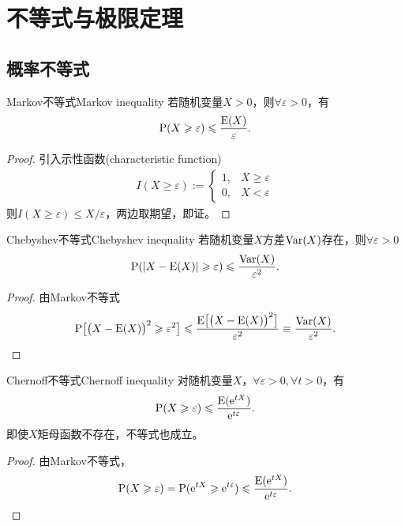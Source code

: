 \chapter{不等式与极限定理}
\section{概率不等式}
\begin{theorem}{Markov不等式}{Markov inequality}
	若随机变量$X>0$，则$\forall\varepsilon>0$，有
	\begin{align}
		\operatorname{P}(X\geqslant\varepsilon)\leqslant\frac{\operatorname{E}(X)}\varepsilon.
	\end{align}
\end{theorem}
\begin{proof}
	引入示性函数(characteristic function)
	\begin{align*}
		I(X\geqslant\varepsilon):=\begin{cases}
			1,&X\geqslant\varepsilon\\
			0,&X<\varepsilon
		\end{cases}
	\end{align*}
	则$I(X\geqslant\varepsilon)\leqslant X/\varepsilon$，两边取期望，即证。
\end{proof}
\begin{theorem}{Chebyshev不等式}{Chebyshev inequality}
	若随机变量$X$方差$\operatorname{Var}(X)$存在，则$\forall\varepsilon>0$
	\begin{align}
		\operatorname{P}(|X-\operatorname{E}(X)|\geqslant\varepsilon)\leqslant\frac{\operatorname{Var}(X)}{\varepsilon^2}.
	\end{align}
\end{theorem}
\begin{proof}
	由Markov不等式
	\begin{align*}
		\operatorname{P}\bigl[\bigl(X-\operatorname{E}(X)\bigr)^2\geqslant\varepsilon^2\bigr]\leqslant\frac{\operatorname{E}\bigl[\bigl(X-\operatorname{E}(X)\bigr)^2\bigr]}{\varepsilon^2}\equiv\frac{\operatorname{Var}(X)}{\varepsilon^2}.
	\end{align*}
\end{proof}
\begin{theorem}{Chernoff不等式}{Chernoff inequality}
	对随机变量$X$，$\forall\varepsilon>0,\forall t>0$，有
	\begin{align}
		\operatorname{P}(X\geqslant\varepsilon)\leqslant\frac{\operatorname{E}(\mathop{}\!\mathrm{e}^{tX})}{\mathop{}\!\mathrm{e}^{t\varepsilon}}.
	\end{align}
	即使$X$矩母函数不存在，不等式也成立。
\end{theorem}
\begin{proof}
	由Markov不等式，
	\begin{align*}
		\operatorname{P}(X\geqslant\varepsilon)=\operatorname{P}(\mathop{}\!\mathrm{e}^{tX}\geqslant\mathop{}\!\mathrm{e}^{t\varepsilon})\leqslant\frac{\operatorname{E}(\mathop{}\!\mathrm{e}^{tX})}{\mathop{}\!\mathrm{e}^{t\varepsilon}}.
	\end{align*}
\end{proof}
